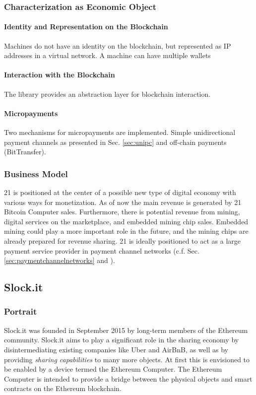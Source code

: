 \subsubsection{Characterization as Economic Object}

\paragraph{Identity and Representation on the Blockchain}

Machines do not have an identity on the blockchain, but represented as IP addresses in a virtual network. A machine can have multiple wallets 

\paragraph{Interaction with the Blockchain}

The library provides an abstraction layer for blockchain interaction. 

\paragraph{Micropayments}

Two mechanisms for micropayments are implemented. Simple unidirectional payment channels as presented in Sec. \ref{sec:unipc} and off-chain payments (BitTransfer). 

\subsubsection{Business Model}

21 is positioned at the center of a possible new type of digital economy with various ways for monetization. As of now the main revenue is generated by 21 Bitcoin Computer sales. Furthermore, there is potential revenue from mining, digital services on the marketplace, and embedded mining chip sales. Embedded mining could play a more important role in the future, and the mining chips are already prepared for revenue sharing. 21 is ideally positioned to act as a large payment service provider in payment channel networks (c.f. Sec. \ref{sec:paymentchannelnetworks} and \cite{decker2015Duplex}).


\subsection{Slock.it}

\subsubsection{Portrait}
Slock.it was founded in September 2015 by long-term members of the Ethereum community. Slock.it aims to play a significant role in the sharing economy by disintermediating existing companies like Uber and AirBnB, as well as by providing \emph{sharing capabilities} to many more objects. At first this is envisioned to be enabled by a device termed the Ethereum Computer. The Ethereum Computer is intended to provide a bridge between the physical objects and smart contracts on the Ethereum blockchain.

